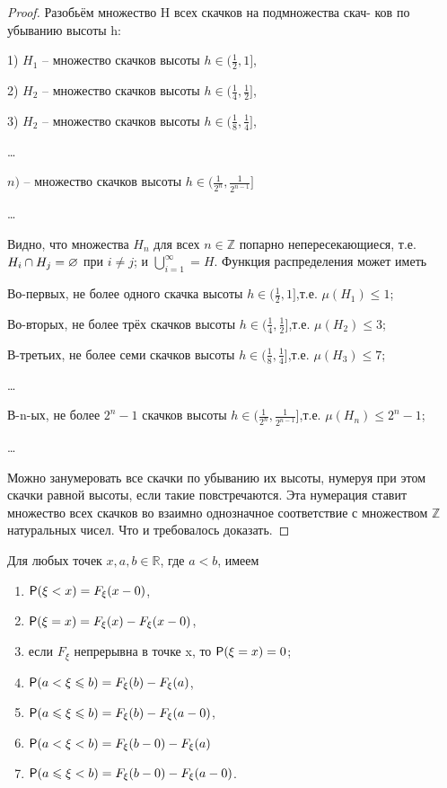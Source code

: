 \begin{proof}
	Разобьём множество H всех скачков на подмножества скач-
ков по убыванию высоты h:
	
	1) $H_1$ – множество скачков высоты $h\in(\frac{1}{2},1]$,

	2)  $H_2$ – множество скачков высоты $h\in(\frac{1}{4},\frac{1}{2}]$,

	3) $H_2$ – множество скачков высоты $h\in(\frac{1}{8},\frac{1}{4}]$,

	\dots

	$n)$ – множество скачков высоты $h\in(\frac{1}{2^n},\frac{1}{2^{n-1}}]$

	\dots



Видно, что множества $H_n$ для всех $n\in\mathbb{Z}$ попарно непересекающиеся, т.е.
$H_i \cap H_j=\O$  при $i\neq j$; и $\bigcup\limits_{i=1}^{\infty}=H$.
Функция распределения может иметь

Во-первых, 	не более одного  скачка высоты $h\in(\frac{1}{2},1]$,т.е. 
$\mu(H_1)\leqslant 1$;

Во-вторых, 	не более трёх  скачков высоты $h\in(\frac{1}{4},\frac{1}{2}]$,т.е. 
$\mu(H_2)\leqslant 3$;

В-третьих, 	не более семи  скачков высоты $h\in(\frac{1}{8},\frac{1}{4}]$,т.е. 
$\mu(H_3)\leqslant 7$;

\ldots

В-n-ых, не более $2^n-1$ скачков высоты $h\in(\frac{1}{2^n},\frac{1}{2^{n-1}}]$,т.е.
$\mu(H_n)\leqslant 2^n-1$;

\ldots

Можно занумеровать все скачки по убыванию их высоты, нумеруя при
этом скачки равной высоты, если такие повстречаются. Эта нумерация ставит
множество всех скачков во взаимно однозначное соответствие с множеством
$\mathbb{Z}$ натуральных чисел. Что и требовалось доказать.

\end{proof}

\begin{theorem}
\label{th:11.6}
	Для любых точек $x,a,b \in\mathbb{R}$, где $a<b$, имеем 
	\newline
	\begin{enumerate}
		\item $\P(\xi<x)=F_{\xi}(x-0)$,
		\item $\P(\xi=x)=F_{\xi}(x)-F_{\xi}(x-0)$,
		\item если $F_{\xi}$ непрерывна в точке x, то $\P(\xi = x) = 0$;
		\item  $\P(a<\xi\leqslant b)=F_{\xi}(b)-F_{\xi}(a)$,
		\item $\P(a\leqslant\xi\leqslant b)=F_{\xi}(b)-F_{\xi}(a-0)$,
		\item $\P(a<\xi<b)=F_{\xi}(b-0)-F_{\xi}(a)$
		\item $\P(a\leqslant\xi<b)=F_{\xi}(b-0)-F_{\xi}(a-0)$.
	\end{enumerate}
\end{theorem}

